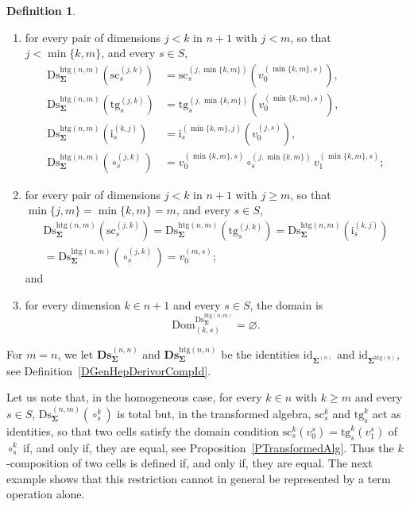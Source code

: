 \documentclass[a4paper, reqno]{amsbook}
\newcommand{\bb}[1]{\ensuremath{\lvert #1 \rvert}}
\newcommand{\sig}[1]{\mathbf{#1}}             %
\newcommand{\Dom}{\mathrm{Dom}}
\newcommand{\htg}{\mathrm{htg}}                %
\newcommand{\id}{\mathrm{id}}
\newcommand{\src}{\mathrm{sc}}
\newcommand{\tgt}{\mathrm{tg}}
\newcommand{\Ds}{\mathrm{Ds}}
\newcommand{\bDs}{\mathbf{Ds}}
\theoremstyle{plain}
\theoremstyle{definition}
\newtheorem{definition}[theorem]{Definition}
\begin{document}
\begin{definition}
\begin{enumerate}
\begin{enumerate}
$$
\Ds^{\htg(n,m)}_{\sig{\Sigma}}(\sigma_{k})=\sigma_{\min\{k,m\}}\left(\left(v^{(\min\{k,m\},\mathbf{s})}_{p}\right)_{p\in\bb{\mathbf{s}}}\right);
$$
\item for every pair of dimensions $j<k$ in $n+1$ with $j<m$, so that $j<\min\{k,m\}$, and every $s\in S$,
\begin{align*}
\Ds^{\htg(n,m)}_{\sig{\Sigma}}(\src^{(j,k)}_{s})&=\src^{(j,\min\{k,m\})}_{s}\left(v^{(\min\{k,m\},s)}_{0}\right),\\
\Ds^{\htg(n,m)}_{\sig{\Sigma}}(\tgt^{(j,k)}_{s})&=\tgt^{(j,\min\{k,m\})}_{s}\left(v^{(\min\{k,m\},s)}_{0}\right),\\
\Ds^{\htg(n,m)}_{\sig{\Sigma}}(\mathrm{i}^{(k,j)}_{s})&=\mathrm{i}^{(\min\{k,m\},j)}_{s}\left(v^{(j,s)}_{0}\right),\\
\Ds^{\htg(n,m)}_{\sig{\Sigma}}(\circ^{(j,k)}_{s})&=v^{(\min\{k,m\},s)}_{0}\circ^{(j,\min\{k,m\})}_{s}v^{(\min\{k,m\},s)}_{1};
\end{align*}
\item for every pair of dimensions $j<k$ in $n+1$ with $j\geq m$, so that $\min\{j,m\}=\min\{k,m\}=m$, and every $s\in S$,
\begin{multline*}
\Ds^{\htg(n,m)}_{\sig{\Sigma}}(\src^{(j,k)}_{s})=
\Ds^{\htg(n,m)}_{\sig{\Sigma}}(\tgt^{(j,k)}_{s})=
\Ds^{\htg(n,m)}_{\sig{\Sigma}}(\mathrm{i}^{(k,j)}_{s})
\\=
\Ds^{\htg(n,m)}_{\sig{\Sigma}}(\circ^{(j,k)}_{s})=v^{(m,s)}_{0};
\end{multline*}
and
\item for every dimension $k\in n+1$ and every $s\in S$, the domain is
$$
\Dom^{\Ds^{\htg(n,m)}_{\sig{\Sigma}}}_{(k,s)}=\varnothing.
$$
\end{enumerate}
\end{enumerate}
For $m=n$, we let $\bDs^{(n,n)}_{\sig{\Sigma}}$ and $\bDs^{\htg(n,n)}_{\sig{\Sigma}}$ be the identities $\id_{\sig{\Sigma}^{(n)}}$ and $\id_{\sig{\Sigma}^{\htg(n)}}$, see Definition~\ref{DGenHepDerivorCompId}.
\end{definition}

Let us note that, in the homogeneous case, for every $k\in n$ with $k\geq m$ and every $s\in S$, $\Ds^{(n,m)}_{\sig{\Sigma}}(\circ^{k}_{s})$ is total but, in the transformed algebra, $\src^{k}_{s}$ and $\tgt^{k}_{s}$ act as identities, so that two cells satisfy the domain condition $\src^{k}_{s}(v^{s}_{0})=\tgt^{k}_{s}(v^{s}_{1})$ of $\circ^{k}_{s}$ if, and only if, they are equal, see Proposition~\ref{PTransformedAlg}.
Thus the $k$-composition of two cells is defined if, and only if, they are equal.
The next example shows that this restriction cannot in general be represented by a term operation alone.
\end{document}

